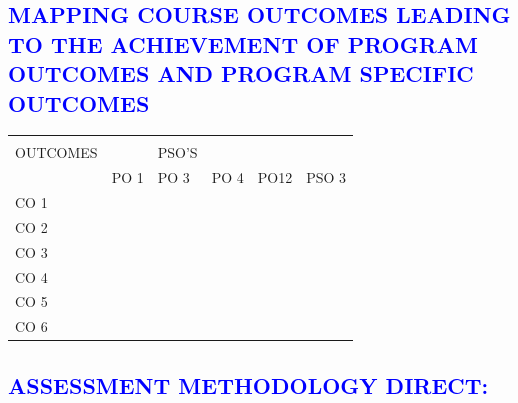 \documentclass[11pt]{exam}
\newcommand*{\boldcheckmark}{%
	\textpdfrender{
		TextRenderingMode=FillStroke,
		LineWidth=.5pt, %
	}{\checkmark}%
}
\begin{document}
\vspace{-1.5cm}
\textcolor{blue}{\section{\large \bfseries	MAPPING COURSE OUTCOMES LEADING TO THE ACHIEVEMENT OF PROGRAM OUTCOMES AND PROGRAM SPECIFIC OUTCOMES}}\vspace{-0.4cm}
\begin{flushleft}
	\begin{longtable}{|>{\centering\arraybackslash}p{4cm}  | >{\centering\arraybackslash}p{1.75cm}  |   >{\centering\arraybackslash}p{1.75cm} |>{\centering\arraybackslash}p{1.75cm}| >{\centering\arraybackslash}p{1.75cm}|>{\centering\arraybackslash}p{2.5cm}  | }
	\hline	
\multirow{2}{*}{\textbf{\begin{tabular}[c]{@{}c@{}}\small  COURSE \\\small OUTCOMES\end{tabular}}} & \multicolumn{4}{l|}{PROGRAM OUTCOMES} & PSO'S \\ \cline{2-5} 
	       &     PO 1    &   PO 3    &   PO 4    & PO12& PSO 3\\ \hline
CO 1	&   \boldcheckmark    &     &       &  &\\ \hline
CO 2	&      & \boldcheckmark      & \boldcheckmark      &  &\\ \hline
CO 3	&   \boldcheckmark  &      & \boldcheckmark      &  &\\ \hline
CO 4	&      &    \boldcheckmark   &      & \boldcheckmark &\\ \hline
CO 5	&  \boldcheckmark    &     &      &  &\boldcheckmark\\ \hline
CO 6	&      & \boldcheckmark     &       &  \boldcheckmark&\\ \hline

	\end{longtable}
\end{flushleft}\vspace{-1.75cm}
\textcolor{blue}{\section{\large \bfseries ASSESSMENT METHODOLOGY DIRECT:}}\vspace{-0.24cm}
\end{document}
